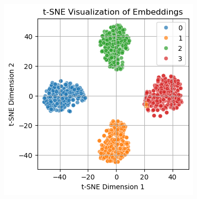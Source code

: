   \begin{figure}[!htbp]
    \centering
    \includegraphics[width=0.8\linewidth]{../plots/unsupervised-orientation/tsne.png}
    \caption{ }
    \label{fig:tSNE}
  \end{figure}

